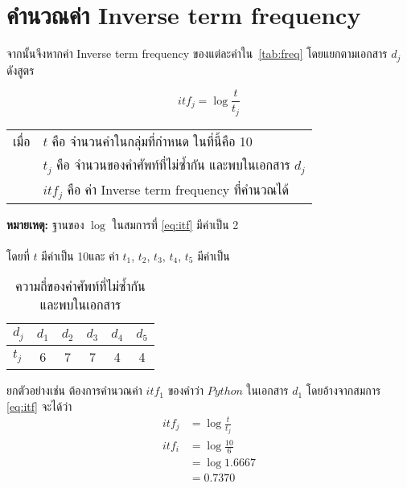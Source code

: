 \documentclass[11pt,a4paper]{article}
\newcommand{\numberOfCollection}{10}
\begin{document}
{    \clearpage
    \section{คำนวณค่า Inverse term frequency}
    จากนั้นจึงหากค่า Inverse term frequency ของแต่ละคำใน\tablename\ \ref{tab:freq} โดยแยกตามเอกสาร $d_j$ ดังสูตร

    \begin{equation} 
        \label{eq:itf}
        itf_j = \log{\frac{t}{t_j}}
    \end{equation}

    \begin{table}[ht!]
        \begin{tabular}{p{2cm}l}
            เมื่อ & $t$ คือ จำนวนคำในกลุ่มที่กำหนด ในที่นี้คือ \numberOfCollection\ \\
                & $t_j$ คือ จำนวนของคำศัพท์ที่ไม่ซ้ำกัน และพบในเอกสาร $d_j$ \\
                & $itf_j$ คือ ค่า Inverse term frequency ที่คำนวณได้ \\
        \end{tabular}
    \end{table}
    {\bf หมายเหตุ:} ฐานของ $\log$ ในสมการที่ \ref{eq:itf} มีค่าเป็น 2  \\\\

    โดยที่ $t$ มีค่าเป็น \numberOfCollection และ ค่า $t_1$, $t_2$, $t_3$, $t_4$, $t_5$ มีค่าเป็น 
    \begin{table}[ht!]
        \centering
        \caption{ความถี่ของคำศัพท์ที่ไม่ซ้ำกันและพบในเอกสาร}
        \label{tab:keywordfreq}
        \begin{tabular}{|l||ccccc|}
            \hline
            $d_j$ & $d_1$ & $d_2$ & $d_3$ & $d_4$ & $d_5$ \\
            \hline
            $t_j$ & 6     & 7     & 7     & 4     & 4 \\
            \hline
        \end{tabular}
    \end{table}

    ยกตัวอย่างเช่น ต้องการคำนวณค่า $itf_1$ ของคำว่า $Python$ ในเอกสาร $d_1$ โดยอ้างจากสมการ \ref{eq:itf} จะได้ว่า
    \begin{equation*}
        \begin{aligned}
            itf_j &= \log{\frac{t}{t_j}} \\
            itf_i &= \log{\frac{10}{6}} \\
                  &= \log{1.6667} \\
                  &= 0.7370
        \end{aligned}
    \end{equation*}

}
\end{document}
